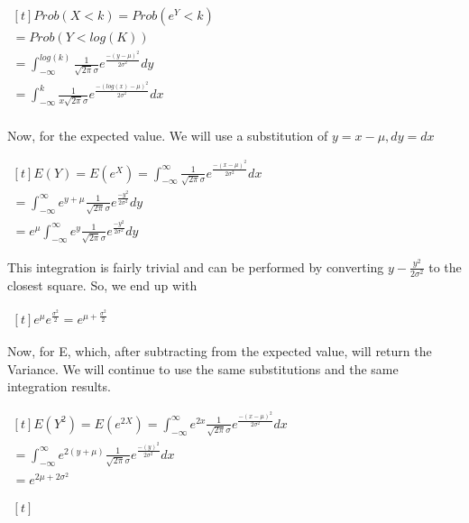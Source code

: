 \documentclass[]{article}
\begin{document}
\begin{center}
 $
    \begin{aligned}[t]
	Prob(X<k)=Prob(e^Y<k)\\
=Prob(Y<log(K))\\
= \int_{-\infty}^{log(k)} \frac{1}{\sqrt{2\pi}\sigma}e^\frac{-(y-\mu)^2}{2\sigma^2} dy\\
= \int_{-\infty}^{k} \frac{1}{x\sqrt{2\pi}\sigma}e^\frac{-(log(x)-\mu)^2}{2\sigma^2} dx\\
\end{aligned}
$
\end{center}
Now, for the expected value. We will use a substitution of $y=x-\mu,dy=dx$
\begin{center}
 $
    \begin{aligned}[t]
	E(Y)=E(e^X)= \int_{-\infty}^{\infty} \frac{1}{\sqrt{2\pi}\sigma}e^\frac{-(x-\mu)^2}{2\sigma^2} dx\\
	=\int_{-\infty}^{\infty}e^{y+\mu} \frac{1}{\sqrt{2\pi}\sigma}e^\frac{-y^2}{2\sigma^2} dy\\
	={e^\mu}\int_{-\infty}^{\infty}e^{y} \frac{1}{\sqrt{2\pi}\sigma}e^\frac{-y^2}{2\sigma^2} dy
\end{aligned}
$

\end{center}
This integration is fairly trivial and can be performed by converting $y-\frac{y^2}{2\sigma^2}$ to the closest square.
So, we end up with
\begin{center}
 $
    \begin{aligned}[t]
	{e^\mu}{e^\frac{\sigma^2}{2}}=e^{\mu+\frac{\sigma^2}{2}}
\end{aligned}
$
\end{center}
Now, for E\big[$X^2$\big], which, after subtracting from the expected value, will return the Variance. We will continue to use the same substitutions and the same integration results.
\begin{center}
 $
    \begin{aligned}[t]
	E(Y^2)=E(e^{2X})=\int_{-\infty}^{\infty}e^{2x} \frac{1}{\sqrt{2\pi}\sigma}e^\frac{-(x-\mu)^2}{2\sigma^2} dx\\
	=\int_{-\infty}^{\infty}e^{2(y+\mu)} \frac{1}{\sqrt{2\pi}\sigma}e^\frac{-(y)^2}{2\sigma^2} dx\\
	=e^{2\mu+2\sigma^2}
\end{aligned}
$
\end{center}
\begin{center}
 $
    \begin{aligned}[t]
	
\end{aligned}
$
\end{center}
\end{document}
